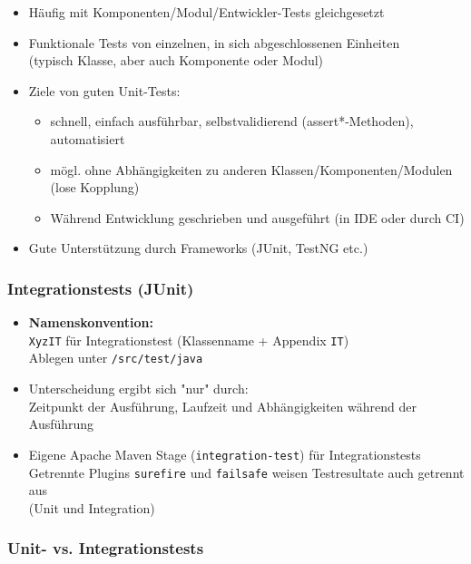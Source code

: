 \documentclass[a4paper]{article}
\begin{document}
			\begin{itemize}
				\item Häufig mit Komponenten/Modul/Entwickler-Tests gleichgesetzt
				\item Funktionale Tests von einzelnen, in sich abgeschlossenen Einheiten\\
						(typisch Klasse, aber auch Komponente oder Modul)
				\item Ziele von guten Unit-Tests:
					\begin{itemize}
						\item schnell, einfach ausführbar, selbstvalidierend (assert*-Methoden), automatisiert
						\item mögl. ohne Abhängigkeiten zu anderen Klassen/Komponenten/Modulen (lose Kopplung)
						\item Während Entwicklung geschrieben und ausgeführt (in IDE oder durch CI)
					\end{itemize}
				\item Gute Unterstützung durch Frameworks (JUnit, TestNG etc.)
			\end{itemize}
		
			\subsubsection{Integrationstests (JUnit)}
			
			\begin{itemize}
				\item \textbf{Namenskonvention:}\\
					\texttt{XyzIT} für Integrationstest (Klassenname + Appendix \texttt{IT})\\
					Ablegen unter \texttt{/src/test/java}
					
				\item Unterscheidung ergibt sich "nur" durch:\\
				Zeitpunkt der Ausführung, Laufzeit und Abhängigkeiten während der Ausführung
				
				\item Eigene Apache Maven Stage (\texttt{integration-test}) für Integrationstests\\
				Getrennte Plugins \texttt{surefire} und \texttt{failsafe} weisen Testresultate auch getrennt aus\\
				(Unit und Integration)
			\end{itemize}
		
			\subsubsection{Unit- vs. Integrationstests}
			
\end{document}
